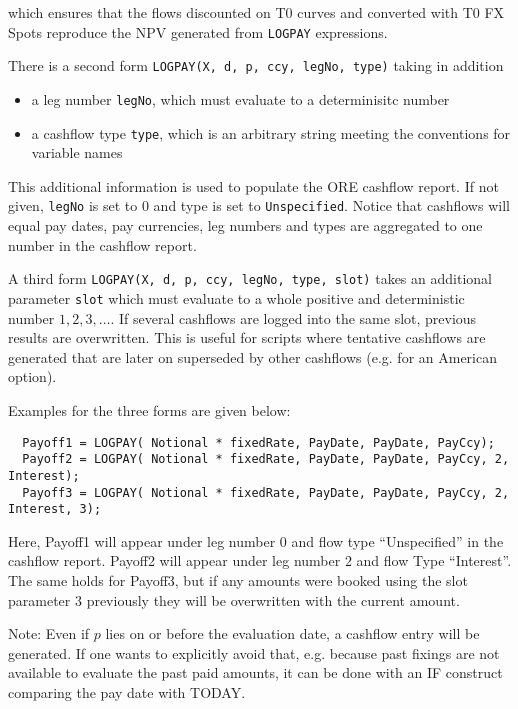 which ensures that the flows discounted on T0 curves and converted with T0 FX Spots reproduce the NPV generated from
\verb+LOGPAY+ expressions.

There is a second form {\tt LOGPAY(X, d, p, ccy, legNo, type)} taking in addition

\begin{itemize}
\item a leg number \verb+legNo+, which must evaluate to a determinisitc number
\item a cashflow type \verb+type+, which is an arbitrary string meeting the conventions for variable names
\end{itemize}

This additional information is used to populate the ORE cashflow report. If not given, \verb+legNo+ is set to $0$ and
type is set to \verb+Unspecified+. Notice that cashflows will equal pay dates, pay currencies, leg numbers and types are
aggregated to one number in the cashflow report.

A third form {\tt LOGPAY(X, d, p, ccy, legNo, type, slot)} takes an additional parameter \verb+slot+ which must evaluate
to a whole positive and deterministic number $1,2,3,\ldots$. If several cashflows are logged into the same slot,
previous results are overwritten. This is useful for scripts where tentative cashflows are generated that are later on
superseded by other cashflows (e.g. for an American option).

Examples for the three forms are given below:

\begin{verbatim}
  Payoff1 = LOGPAY( Notional * fixedRate, PayDate, PayDate, PayCcy);
  Payoff2 = LOGPAY( Notional * fixedRate, PayDate, PayDate, PayCcy, 2, Interest);
  Payoff3 = LOGPAY( Notional * fixedRate, PayDate, PayDate, PayCcy, 2, Interest, 3);
\end{verbatim}

Here, Payoff1 will appear under leg number $0$ and flow type ``Unspecified'' in the cashflow report. Payoff2 will appear
under leg number $2$ and flow Type ``Interest''. The same holds for Payoff3, but if any amounts were booked using the
slot parameter $3$ previously they will be overwritten with the current amount.

Note: Even if $p$ lies on or before the evaluation date, a cashflow entry will be generated. If one wants to explicitly
avoid that, e.g. because past fixings are not available to evaluate the past paid amounts, it can be done with an IF
construct comparing the pay date with TODAY.

